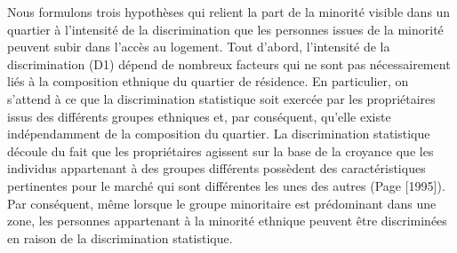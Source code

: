 \documentclass[10pt]{Revue-economique} %
\begin{document}
Nous formulons trois hypothèses qui relient la part de la minorité visible dans un quartier à l’intensité de la discrimination que les personnes issues de la minorité peuvent subir dans l’accès au logement. Tout d’abord, l’intensité de la discrimination (D1) dépend de nombreux facteurs qui ne sont pas nécessairement liés à la composition ethnique du quartier de résidence. En particulier, on s’attend à ce que la discrimination statistique soit exercée par les propriétaires issus des différents groupes ethniques et, par conséquent, qu’elle existe indépendamment de la composition du quartier. La discrimination statistique découle du fait que les propriétaires agissent sur la base de la croyance que les individus appartenant à des groupes différents possèdent des caractéristiques pertinentes pour le marché qui sont différentes les unes des autres (Page [1995]). Par conséquent, même lorsque le groupe minoritaire est prédominant dans une zone, les personnes appartenant à la minorité ethnique peuvent être discriminées en raison de la discrimination statistique.
\end{document}
